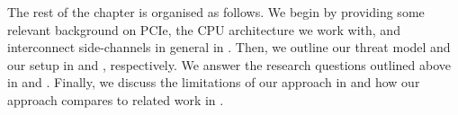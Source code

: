 The rest of the chapter is organised as follows.
We begin by providing some relevant background on PCIe, the CPU architecture we work with, and interconnect side-channels in general in . 
Then, we outline our threat model and our setup in  and , respectively.
We answer the research questions outlined above in  and .
Finally, we discuss the limitations of our approach in  and how our approach compares to related work in .


\endinput